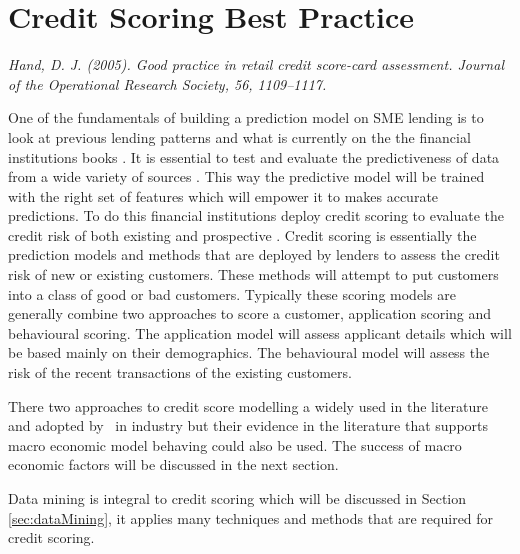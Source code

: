 \section{Credit Scoring Best Practice}
\textit{Hand, D. J. (2005). Good practice in retail credit score-card assessment. Journal of the
Operational Research Society, 56, 1109–1117.}

One of the fundamentals of building a prediction model on SME lending is to look at previous lending patterns and what is currently on the the financial institutions books \citep{lawless_irish_2012}. It is essential to test and evaluate the predictiveness of data from a wide variety of sources \citep{lawless_smes_2012}. This way the predictive model will be trained with the right set of features which will empower it to makes accurate predictions. To do this financial institutions deploy credit scoring to evaluate the credit risk of both existing and prospective \citep{kennedy_credit_2013}. Credit scoring is essentially the prediction models and methods that are deployed by lenders to assess the credit risk of new or existing customers. These methods will attempt to put customers into a class of good or bad customers. Typically these scoring models are generally combine two approaches to score a customer, application scoring and behavioural scoring. The application model will assess applicant details which will be based mainly on their demographics. The behavioural model will assess the risk of the recent transactions of the existing customers. 

There two approaches to credit score modelling a widely used in the literature and adopted by \subjectname\ in industry but their evidence in the literature that supports macro economic model behaving could also be used. The success of macro economic factors will be discussed in the next section.

Data mining  is integral to credit scoring which will be discussed in Section \ref{sec:dataMining}, it applies many techniques and methods that are required for credit scoring.
